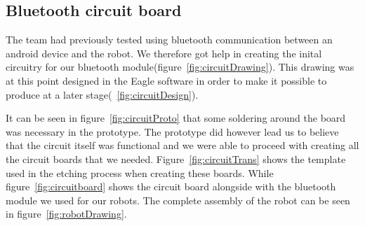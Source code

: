 \subsection{Bluetooth circuit board}
The \chirp team had previously tested using bluetooth communication between an android device and the robot. We therefore got help in creating the inital circuitry for our bluetooth module(figure~\ref{fig:circuitDrawing}). This drawing was at this point designed in the Eagle software in order to make it possible to produce at a later stage(~\ref{fig:circuitDesign}). 

\bigskip\noindent
It can be seen in figure~\ref{fig:circuitProto} that some soldering around the board was necessary in the prototype. The prototype did however lead us to believe that the circuit itself was functional and we were able to proceed with creating all the circuit boards that we needed. 
Figure~\ref{fig:circuitTrans} shows the template used in the etching process when creating these boards. While figure~\ref{fig:circuitboard} shows the circuit board alongside with the bluetooth module we used for our robots. The complete assembly of the robot can be seen in figure~\ref{fig:robotDrawing}.

